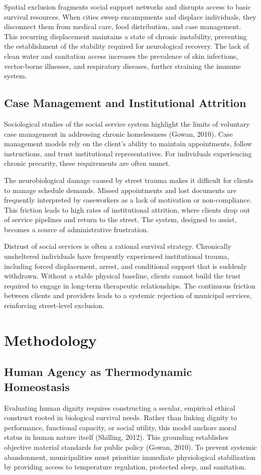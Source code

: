 \documentclass[12pt]{article}
\begin{document}
Spatial exclusion fragments social support networks and disrupts access to basic survival resources. When cities sweep encampments and displace individuals, they disconnect them from medical care, food distribution, and case management. This recurring displacement maintains a state of chronic instability, preventing the establishment of the stability required for neurological recovery. The lack of clean water and sanitation access increases the prevalence of skin infections, vector-borne illnesses, and respiratory diseases, further straining the immune system.

\subsection{Case Management and Institutional Attrition}
Sociological studies of the social service system highlight the limits of voluntary case management in addressing chronic homelessness (Gowan, 2010). Case management models rely on the client's ability to maintain appointments, follow instructions, and trust institutional representatives. For individuals experiencing chronic precarity, these requirements are often unmet.

The neurobiological damage caused by street trauma makes it difficult for clients to manage schedule demands. Missed appointments and lost documents are frequently interpreted by caseworkers as a lack of motivation or non-compliance. This friction leads to high rates of institutional attrition, where clients drop out of service pipelines and return to the street. The system, designed to assist, becomes a source of administrative frustration.

Distrust of social services is often a rational survival strategy. Chronically unsheltered individuals have frequently experienced institutional trauma, including forced displacement, arrest, and conditional support that is suddenly withdrawn. Without a stable physical baseline, clients cannot build the trust required to engage in long-term therapeutic relationships. The continuous friction between clients and providers leads to a systemic rejection of municipal services, reinforcing street-level exclusion.

\section{Methodology}

\subsection{Human Agency as Thermodynamic Homeostasis}
Evaluating human dignity requires constructing a secular, empirical ethical construct rooted in biological survival needs. Rather than linking dignity to performance, functional capacity, or social utility, this model anchors moral status in human nature itself (Shilling, 2012). This grounding establishes objective material standards for public policy (Gowan, 2010). To prevent systemic abandonment, municipalities must prioritize immediate physiological stabilization by providing access to temperature regulation, protected sleep, and sanitation.
\end{document}
